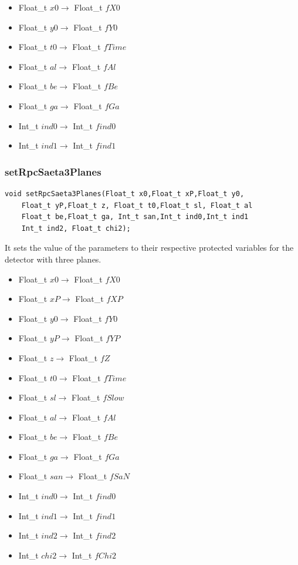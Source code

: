 \documentclass[a4paper]{book}
\begin{document}
\begin{itemize}
	\item Float\_t $x0 \rightarrow$ Float\_t $fX0$
	\item Float\_t $y0 \rightarrow$ Float\_t $fY0$
	\item Float\_t $t0 \rightarrow$ Float\_t $fTime$
	\item Float\_t $al \rightarrow$ Float\_t $fAl$
	\item Float\_t $be \rightarrow$ Float\_t $fBe$
	\item Float\_t $ga \rightarrow$ Float\_t $fGa$
	\item Int\_t $ind0 \rightarrow$ Int\_t $find0$
	\item Int\_t $ind1 \rightarrow$ Int\_t $find1$
\end{itemize}

\subsubsection{setRpcSaeta3Planes}

\begin{lstlisting}
void setRpcSaeta3Planes(Float_t x0,Float_t xP,Float_t y0,
	Float_t yP,Float_t z, Float_t t0,Float_t sl, Float_t al
	Float_t be,Float_t ga, Int_t san,Int_t ind0,Int_t ind1
	Int_t ind2, Float_t chi2);
\end{lstlisting}

It sets the value of the parameters to their respective protected variables for the detector with three planes.

\begin{itemize}
	\item Float\_t $x0 \rightarrow$ Float\_t $fX0$
	\item Float\_t $xP \rightarrow$ Float\_t $fXP$
	\item Float\_t $y0 \rightarrow$ Float\_t $fY0$
	\item Float\_t $yP \rightarrow$ Float\_t $fYP$
	\item Float\_t $z \rightarrow$ Float\_t $fZ$
	\item Float\_t $t0 \rightarrow$ Float\_t $fTime$
	\item Float\_t $sl \rightarrow$ Float\_t $fSlow$
	\item Float\_t $al \rightarrow$ Float\_t $fAl$
	\item Float\_t $be \rightarrow$ Float\_t $fBe$
	\item Float\_t $ga \rightarrow$ Float\_t $fGa$
	\item Float\_t $san \rightarrow$ Float\_t $fSaN$
	\item Int\_t $ind0 \rightarrow$ Int\_t $find0$
	\item Int\_t $ind1 \rightarrow$ Int\_t $find1$
	\item Int\_t $ind2 \rightarrow$ Int\_t $find2$
	\item Int\_t $chi2 \rightarrow$ Int\_t $fChi2$
\end{itemize}
\end{document}
